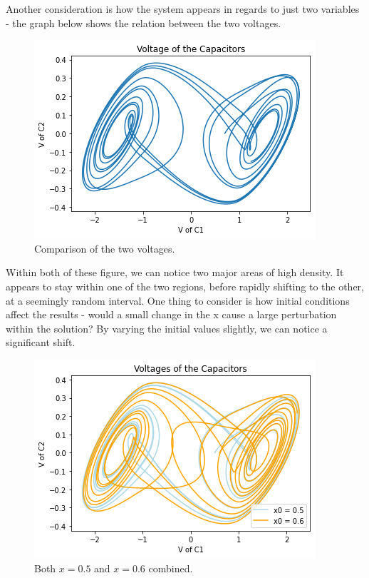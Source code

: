 \documentclass{article}
\begin{document}
    Another consideration is how the system appears in regards to just two variables - the graph below shows the relation between the two voltages. 
    
    \begin{figure}[h!]
        \centering
        \includegraphics[scale = 0.6]{Images/projectionxy.png}
        \caption{Comparison of the two voltages.}
        \label{fig:my_label}
    \end{figure}
    
    Within both of these figure, we can notice two major areas of high density. It appears to stay within one of the two regions, before rapidly shifting to the other, at a seemingly random interval. One thing to consider is how initial conditions affect the results - would a small change in the x cause a large perturbation within the solution? By varying the initial values slightly, we can notice a significant shift. 
    
    \begin{figure}[h!]
        \centering
        \includegraphics[scale=0.6]{Images/combined.png}
        \caption{Both $x=0.5$ and $x=0.6$ combined.}
        \label{fig:my_label}
    \end{figure}
    
\end{document}
